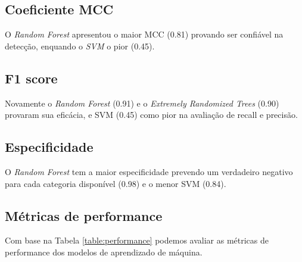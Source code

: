 \documentclass[12pt]{article}
\begin{document}
\subsection{Coeficiente MCC}
O \textit{Random Forest} apresentou o maior MCC (0.81) provando ser confiável na detecção, 
enquando o \textit{SVM} o pior (0.45).
\subsection{F1 score}
Novamente o \textit{Random Forest} (0.91) e o \textit{Extremely Randomized Trees} (0.90) 
provaram sua eficácia, e  SVM (0.45) como pior na avaliação de recall e precisão.
\subsection{Especificidade}
O \textit{Random Forest} tem a maior especificidade prevendo um verdadeiro negativo 
para cada categoria disponível (0.98) e o menor SVM (0.84).

\subsection{Métricas de performance}
Com base na Tabela \ref{table:performance} podemos avaliar as métricas de performance
dos modelos de aprendizado de máquina.

\begin{table}[!h]
  \caption{Métricas de performance dos modelos}
  \label{table:performance}
\end{table}
\end{document}

